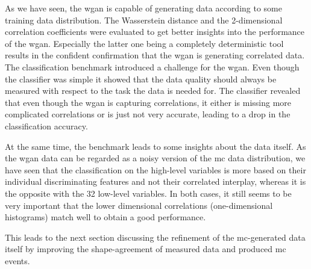 As we have seen, the \gls{wgan} is capable of generating data according to some training data distribution. The Wasserstein distance and the 2-dimensional correlation coefficients were evaluated to get better insights into the performance of the \gls{wgan}. Especially the latter one being a completely deterministic tool results in the confident confirmation that the \gls{wgan} is generating correlated data. The classification benchmark introduced a challenge for the \gls{wgan}. Even though the classifier was simple it showed that the data quality should always be measured with respect to the task the data is needed for. The classifier revealed that even though the \gls{wgan} is capturing correlations, it either is missing more complicated correlations or is just not very accurate, leading to a drop in the classification accuracy.

At the same time, the benchmark leads to some insights about the data itself. As the \gls{wgan} data can be regarded as a noisy version of the \gls{mc} data distribution, we have seen that the classification on the high-level variables is more based on their individual discriminating features and not their correlated interplay, whereas it is the opposite with the 32 low-level variables. In both cases, it still seems to be very important that the lower dimensional correlations (one-dimensional histograms) match well to obtain a good performance.

This leads to the next section discussing the refinement of the \gls{mc}-generated data itself by improving the shape-agreement of measured data and produced \gls{mc} events.
